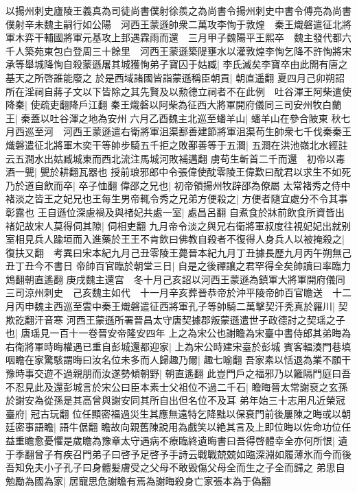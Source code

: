 以揚州刺史廬陵王義真為司徒尚書僕射徐羨之為尚書令揚州刺史中書令傅亮為尚書僕射辛未魏主嗣行如公陽　河西王蒙遜帥衆二萬攻李恂于敦煌　秦王熾磐遣征北將軍木弈干輔國將軍元基攻上邽遇霖雨而還　三月甲子魏陽平王熙卒　魏主發代都六千人築苑東包白登周三十餘里　河西王蒙遜築隄壅水以灌敦煌李恂乞降不許恂將宋承等舉城降恂自殺蒙遜屠其城獲恂弟子寶囚于姑臧|{
	李氏滅矣李寶卒由此開有唐之基天之所啓誰能廢之}
於是西域諸國皆詣蒙遜稱臣朝貢|{
	朝直遥翻}
夏四月己卯朔詔所在淫祠自蔣子文以下皆除之其先賢及以勲德立祠者不在此例　吐谷渾王阿柴遣使降秦|{
	使疏吏翻降戶江翻}
秦王熾磐以阿柴為征西大將軍開府儀同三司安州牧白蘭王|{
	秦蓋以吐谷渾之地為安州}
六月乙酉魏主北巡至蟠羊山|{
	蟠羊山在參合陂東}
秋七月西巡至河　河西王蒙遜遣右衛將軍沮渠鄯善建節將軍沮渠苟生帥衆七千伐秦秦王熾磐遣征北將軍木奕干等帥步騎五千拒之敗鄯善等于五澗|{
	五澗在洪池嶺北水經註云五澗水出姑臧城東而西北流注馬城河敗補邁翻}
虜苟生斬首二千而還　初帝以毒酒一甖|{
	甖於耕翻瓦器也}
授前琅邪郎中令張偉使酖零陵王偉歎曰酖君以求生不如死乃於道自飲而卒|{
	卒子恤翻}
偉邵之兄也|{
	初帝領揚州牧辟邵為僚屬}
太常褚秀之侍中褚淡之皆王之妃兄也王每生男帝輒令秀之兄弟方便殺之|{
	方便者隨宜處分不令其事彰露也}
王自遜位深慮禍及與禇妃共處一室|{
	處昌呂翻}
自煮食於牀前飲食所資皆出禇妃故宋人莫得伺其隙|{
	伺相吏翻}
九月帝令淡之與兄右衛將軍叔度往視妃妃出就别室相見兵人踰垣而入進藥於王王不肯飲曰佛教自殺者不復得人身兵人以被掩殺之|{
	復扶又翻　考異曰宋本紀九月己丑零陵王薨晉本紀九月丁丑據長歷九月丙午朔無己丑丁丑今不書日}
帝帥百官臨於朝堂三日|{
	自是之後禪讓之君罕得全矣帥讀曰率臨力鴆翻朝直遙翻}
庚戌魏主還宫　冬十月己亥詔以河西王蒙遜為鎮軍大將軍開府儀同三司涼州刺史　己亥魏主如代　十一月辛亥葬晉恭帝於沖平陵帝帥百官瞻送　十二月丙申魏主西巡至雲中秦王熾磐遣征西將軍孔子等帥騎二萬擊契汗秃真於羅川|{
	契欺訖翻汗音寒}
河西王蒙遜所署晉昌太守唐契據郡叛蒙遜遣世子政德討之契瑶之子也|{
	唐瑶見一百十一卷晉安帝隆安四年}
上之為宋公也謝瞻為宋臺中書侍郎其弟晦為右衛將軍時晦權遇已重自彭城還都迎家|{
	上為宋公時建宋臺於彭城}
賓客輻湊門巷填咽瞻在家驚駭謂晦曰汝名位未多而人歸趣乃爾|{
	趣七喻翻}
吾家素以恬退為業不願干豫時事交遊不過親朋而汝遂勢傾朝野|{
	朝直遙翻}
此豈門戶之福邪乃以籬隔門庭曰吾不忍見此及還彭城言於宋公曰臣本素士父祖位不過二千石|{
	瞻晦晉太常謝裒之玄孫於謝安為從孫是其高曾與謝安同其所自出但名位不及耳}
弟年始三十志用凡近榮冠臺府|{
	冠古玩翻}
位任顯密福過災生其應無遠特乞降黜以保衰門前後屢陳之晦或以朝廷密事語瞻|{
	語牛倨翻}
瞻故向親舊陳說用為戲笑以絶其言及上即位晦以佐命功位任益重瞻愈憂懼是歲瞻為豫章太守遇病不療臨終遺晦書曰吾得啓體幸全亦何所恨|{
	遺于季翻曾子有疾召門弟子曰啓予足啓予手詩云戰戰兢兢如臨深淵如履薄氷而今而後吾知免夫小子孔子曰身體髪膚受之父母不敢毁傷父母全而生之子全而歸之}
弟思自勉勵為國為家|{
	居寵思危謝瞻有焉為謝晦殺身亡家張本為于偽翻}



